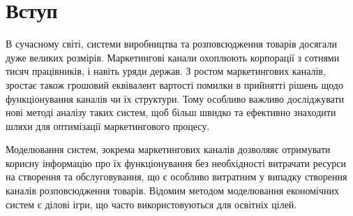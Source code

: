 \section*{Вступ}

В сучасному світі, системи виробництва та розповсюдження товарів досягали дуже великих розмірів. Маркетингові канали охоплюють корпорації з сотнями тисяч працівників, і навіть уряди держав. З ростом маркетингових каналів, зростає також грошовий еквівалент вартості помилки в прийнятті рішень щодо функціонування каналів чи їх структури. Тому особливо важливо досліджувати нові методі аналізу таких систем, щоб більш швидко та ефективно знаходити шляхи для оптимізації маркетингового процесу. 

Моделювання систем, зокрема маркетингових каналів дозволяяє отримувати корисну інформацію про їх функціонування без необхідності витрачати ресурси на створення та обслуговування, що є особливо витратним у випадку створення каналів розповсюдження товарів. Відомим методом моделювання економічних систем є ділові ігри, що часто використовуються для освітніх цілей.
